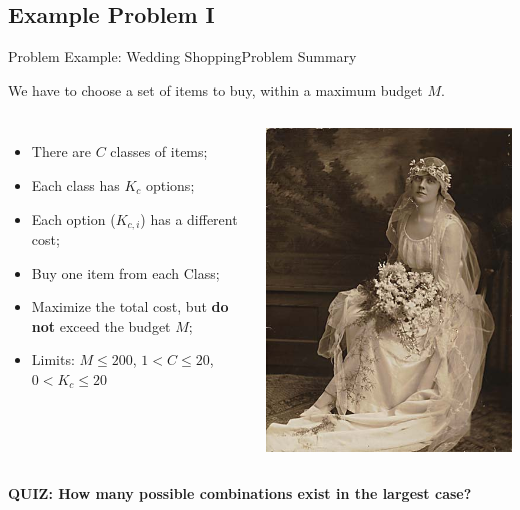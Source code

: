 \subsection{Example Problem I}

\begin{frame}{Problem Example: Wedding Shopping}{Problem Summary}

  We have to choose a set of items to buy, within a maximum budget $M$.

    \begin{columns}
    \begin{itemize}
      \item There are $C$ classes of items;
      \item Each class has $K_c$ options;
      \item Each option ($K_{c,i}$) has a different cost;
      \bigskip

      \item Buy one item from each Class;
      \item Maximize the total cost, but {\bf do not} exceed the budget $M$;
      \bigskip

      \item Limits: $M \leq 200$, $1 < C \leq 20$, $0 < K_c \leq 20$
    \end{itemize}

      \includegraphics[width=.8\textwidth]{../img/weddingdress}\\
    \end{columns}\bigskip

    {\bf QUIZ: How many possible combinations exist in the largest case?}

\end{frame}

